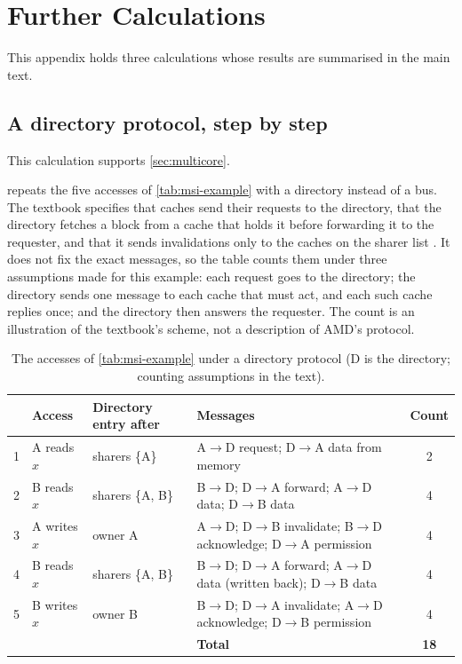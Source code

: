 \section{Further Calculations}
\label{app:worked-examples}

This appendix holds three calculations whose results are summarised in the main text.

\subsection{A directory protocol, step by step}
\label{app:directory-example}
This calculation supports \cref{sec:multicore}.

 repeats the five accesses of \cref{tab:msi-example} with a directory instead of a bus. The textbook specifies that caches send their requests to the directory, that the directory fetches a block from a cache that holds it before forwarding it to the requester, and that it sends invalidations only to the caches on the sharer list \cite[sec.~12.4.6]{sarangi2025basic}. It does not fix the exact messages, so the table counts them under three assumptions made for this example: each request goes to the directory; the directory sends one message to each cache that must act, and each such cache replies once; and the directory then answers the requester. The count is an illustration of the textbook's scheme, not a description of AMD's protocol.

\begin{table}[htbp]
  \centering
  \caption[The five accesses of the MSI trace under a directory protocol]{The accesses of \cref{tab:msi-example} under a directory protocol (D is the directory; counting assumptions in the text).}
  \label{tab:directory-example}
  \small
  \begin{tabularx}{\textwidth}{@{}l>{\raggedright\arraybackslash}p{2.2cm}>{\raggedright\arraybackslash}p{2.6cm}>{\raggedright\arraybackslash}Xc@{}}
    \toprule
    & \textbf{Access} & \textbf{Directory entry after} & \textbf{Messages} & \textbf{Count} \\
    \midrule
    1 & A reads $x$ & sharers \{A\} & A$\to$D request; D$\to$A data from memory & 2 \\
    2 & B reads $x$ & sharers \{A, B\} & B$\to$D; D$\to$A forward; A$\to$D data; D$\to$B data & 4 \\
    3 & A writes $x$ & owner A & A$\to$D; D$\to$B invalidate; B$\to$D acknowledge; D$\to$A permission & 4 \\
    4 & B reads $x$ & sharers \{A, B\} & B$\to$D; D$\to$A forward; A$\to$D data (written back); D$\to$B data & 4 \\
    5 & B writes $x$ & owner B & B$\to$D; D$\to$A invalidate; A$\to$D acknowledge; D$\to$B permission & 4 \\
    \midrule
    & & & \textbf{Total} & \textbf{18} \\
    \bottomrule
  \end{tabularx}
\end{table}

